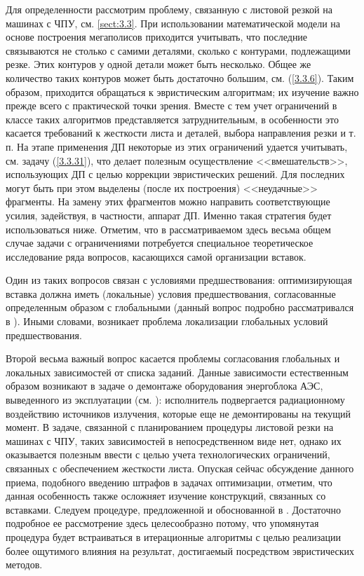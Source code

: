 Для определенности рассмотрим проблему, связанную с
листовой резкой на машинах с ЧПУ,
см. \ref{sect:3.3}.
При использовании
математической модели на основе построения мегаполисов приходится учитывать,
что последние связываются не столько с самими деталями, сколько с контурами,
подлежащими резке.
Этих контуров у одной детали может быть несколько.
Общее же количество таких контуров может быть достаточно большим,
см. (\ref{3.3.6}).
Таким образом, приходится обращаться к эвристическим алгоритмам;
их изучение важно прежде всего с практической точки зрения.
Вместе с тем учет ограничений в классе таких алгоритмов представляется
затруднительным,
в особенности это касается требований к жесткости листа
и деталей, выбора направления резки и т. п.
На этапе применения ДП некоторые
из этих ограничений удается учитывать,
см. задачу (\ref{3.3.31}),
что делает полезным осуществление <<вмешательств>>,
использующих ДП
с целью коррекции эвристических решений.
Для последних могут быть при этом выделены
(после их построения)
<<неудачные>> фрагменты.
На замену этих
фрагментов можно направить соответствующие  усилия,
задействуя, в частности, аппарат ДП.
Именно такая стратегия будет использоваться ниже.
Отметим,
что в рассматриваемом здесь весьма общем случае задачи с ограничениями
потребуется специальное теоретическое исследование ряда вопросов,
касающихся самой организации вставок.

Один из таких вопросов  связан с условиями предшествования:
оптимизирующая вставка должна иметь
(локальные)
условия предшествования, согласованные определенным образом с глобальными
(данный вопрос подробно рассматривался в \cite{Cha14`}).
Иными словами, возникает проблема локализации глобальных
условий предшествования.

Второй весьма важный вопрос касается проблемы согласования глобальных и
локальных зависимостей от списка заданий.
Данные зависимости естественным
образом возникают в задаче о демонтаже оборудования энергоблока АЭС,
выведенного из эксплуатации (см. \cite{Cha2`}):
исполнитель подвергается
радиационному воздействию источников излучения,
которые еще не демонтированы на текущий момент.
В задаче, связанной с планированием процедуры листовой
резки на машинах с ЧПУ, таких зависимостей в непосредственном виде нет,
однако их оказывается полезным ввести с целью учета технологических
ограничений, связанных с обеспечением жесткости листа.
Опуская сейчас
обсуждение данного приема, подобного введению штрафов в задачах оптимизации,
отметим, что данная особенность также осложняет изучение конструкций,
связанных со вставками.
Следуем процедуре, предложенной и обоснованной
в \cite{Cha13`}.
Достаточно подробное ее рассмотрение здесь целесообразно
потому, что упомянутая процедура будет встраиваться в итерационные
алгоритмы с целью реализации более ощутимого влияния на результат,
достигаемый посредством эвристических методов.
